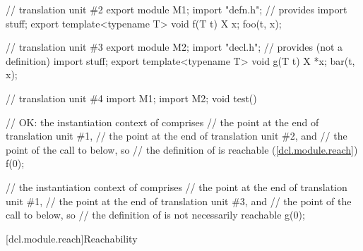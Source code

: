 \begin{std.txt}
\begin{example}
\begin{codeblock}
// translation unit \#2
export module M1;
import "defn.h";        // provides 
import stuff;
export template<typename T> void f(T t) {
 X x;
 foo(t, x);
}

// translation unit \#3
export module M2;
import "decl.h";        // provides  (not a definition)
import stuff;
export template<typename T> void g(T t) {
 X *x;
 bar(t, x);
}

// translation unit \#4
import M1;
import M2;
void test() {
  // OK: the instantiation context of  comprises
  // the point at the end of translation unit \#1,
  // the point at the end of translation unit \#2, and
  // the point of the call to  below, so
  // the definition of  is reachable (\ref{dcl.module.reach})
  f(0);

  // the instantiation context of  comprises
  // the point at the end of translation unit \#1,
  // the point at the end of translation unit \#3, and
  // the point of the call to  below, so
  // the definition of  is not necessarily reachable
  g(0);
}
\end{codeblock}
\end{example}
\end{std.txt}

[dcl.module.reach]{Reachability}

